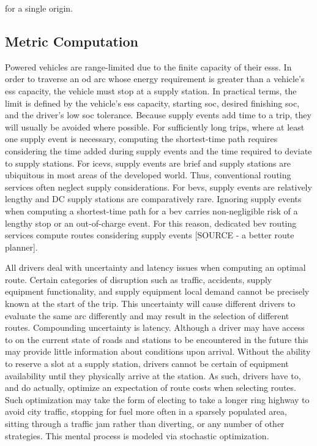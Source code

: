 \documentclass[11pt]{article}
\begin{document}
\begin{multicols}{2}
for a single origin.

\subsection*{Metric Computation}

Powered vehicles are range-limited due to the finite capacity of their \glspl{ess}. In order to traverse an \gls{od} arc whose energy requirement is greater than a vehicle's \gls{ess} capacity, the vehicle must stop at a supply station. In practical terms, the limit is defined by the vehicle's \gls{ess} capacity, starting \gls{soc}, desired finishing \gls{soc}, and the driver's low \gls{soc} tolerance. Because supply events add time to a trip, they will usually be avoided where possible. For sufficiently long trips, where at least one supply event is necessary, computing the shortest-time path requires considering the time added during supply events and the time required to deviate to supply stations. For \glspl{icev}, supply events are brief and supply stations are ubiquitous in most areas of the developed world. Thus, conventional routing services often neglect supply considerations. For \glspl{bev}, supply events are relatively lengthy and DC supply stations are comparatively rare. Ignoring supply events when computing a shortest-time path for a \gls{bev} carries non-negligible risk of a lengthy stop or an out-of-charge event. For this reason, dedicated \gls{bev} routing services compute routes considering supply events [SOURCE  - a better route planner].

All drivers deal with uncertainty and latency issues when computing an optimal route. Certain categories of disruption such as traffic, accidents, supply equipment functionality, and supply equipment local demand cannot be precisely known at the start of the trip. This uncertainty will cause different drivers to evaluate the same arc differently and may result in the selection of different routes. Compounding uncertainty is latency. Although a driver may have access to on the current state of roads and stations to be encountered in the future this may provide little information about conditions upon arrival. Without the ability to reserve a slot at a supply station, drivers cannot be certain of equipment availability until they physically arrive at the station. As such, drivers have to, and do actually, optimize an expectation of route costs when selecting routes. Such optimization may take the form of electing to take a longer ring highway to avoid city traffic, stopping for fuel more often in a sparsely populated area, sitting through a traffic jam rather than diverting, or any number of other strategies. This mental process is modeled via stochastic optimization.


\end{multicols}
\end{document}
